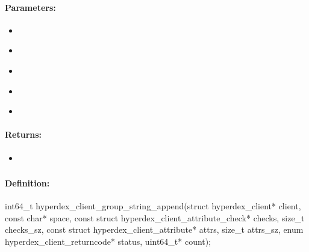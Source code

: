 \paragraph{Parameters:}
\begin{itemize}[noitemsep]
\item {}\\

\item {}\\

\item {}\\

\item {}\\

\item {}\\

\end{itemize}

\paragraph{Returns:}
\begin{itemize}[noitemsep]
\item {}\\

\end{itemize}

\pagebreak
\subsubsection{}
\label{api:c:group_string_append}


\paragraph{Definition:}
\begin{ccode}
int64_t hyperdex_client_group_string_append(struct hyperdex_client* client,
        const char* space,
        const struct hyperdex_client_attribute_check* checks, size_t checks_sz,
        const struct hyperdex_client_attribute* attrs, size_t attrs_sz,
        enum hyperdex_client_returncode* status,
        uint64_t* count);
\end{ccode}


